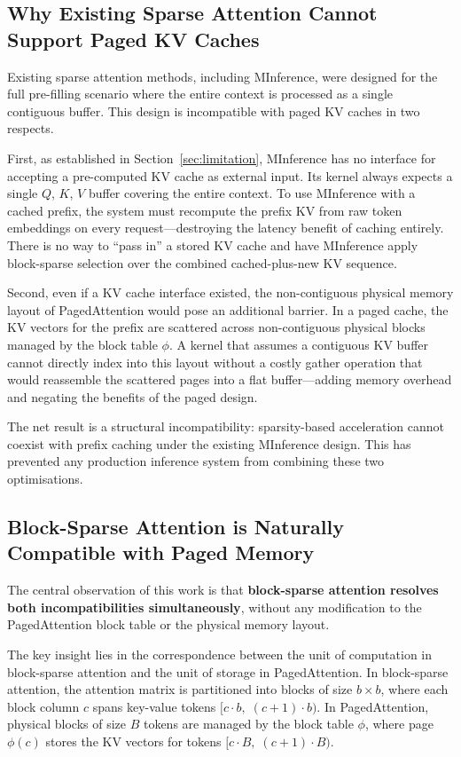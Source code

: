 \documentclass{article}
\begin{document}
\subsection{Why Existing Sparse Attention Cannot Support Paged KV Caches}

Existing sparse attention methods, including MInference, were designed for
the full pre-filling scenario where the entire context is processed as a
single contiguous buffer. This design is incompatible with paged KV caches
in two respects.

First, as established in Section~\ref{sec:limitation}, MInference has no
interface for accepting a pre-computed KV cache as external input. Its
kernel always expects a single $Q$, $K$, $V$ buffer covering the entire
context. To use MInference with a cached prefix, the system must recompute
the prefix KV from raw token embeddings on every request---destroying the
latency benefit of caching entirely. There is no way to ``pass in'' a
stored KV cache and have MInference apply block-sparse selection over the
combined cached-plus-new KV sequence.

Second, even if a KV cache interface existed, the non-contiguous physical
memory layout of PagedAttention would pose an additional barrier. In a
paged cache, the KV vectors for the prefix are scattered across
non-contiguous physical blocks managed by the block table $\phi$. A kernel
that assumes a contiguous KV buffer cannot directly index into this layout
without a costly gather operation that would reassemble the scattered pages
into a flat buffer---adding memory overhead and negating the benefits of
the paged design.

The net result is a structural incompatibility: sparsity-based acceleration
cannot coexist with prefix caching under the existing MInference design.
This has prevented any production inference system from combining these two
optimisations.

\subsection{Block-Sparse Attention is Naturally Compatible with Paged Memory}

The central observation of this work is that \textbf{block-sparse attention
resolves both incompatibilities simultaneously}, without any modification
to the PagedAttention block table or the physical memory layout.

The key insight lies in the correspondence between the unit of computation
in block-sparse attention and the unit of storage in PagedAttention. In
block-sparse attention, the attention matrix is partitioned into blocks of
size $b \times b$, where each block column $c$ spans key-value tokens
$[c \cdot b,\; (c+1) \cdot b)$. In PagedAttention, physical blocks of
size $B$ tokens are managed by the block table $\phi$, where page $\phi(c)$
stores the KV vectors for tokens $[c \cdot B,\; (c+1) \cdot B)$.
\end{document}
